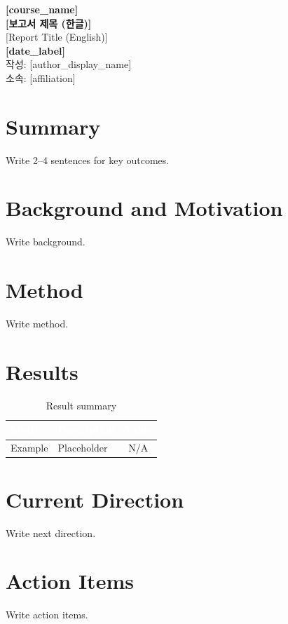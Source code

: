 \documentclass[11pt,a4paper]{article}
\newenvironment{keybox}[1]{%
  \begin{tcolorbox}[colback=bgLight, colframe=themeBlue!60,
    title={\small\bfseries\color{white}#1},
    coltitle=white, colbacktitle=themeBlue,
    left=6pt, right=6pt, top=4pt, bottom=4pt,
    boxrule=0.6pt]
}{\end{tcolorbox}}
\begin{document}
\begin{titlepage}
\pagecolor{themeNavy}
\color{white}
\vspace*{1.8cm}
\begin{center}
{\small\color{themeLight}\textbf{[course\_name]}}\\[1.2cm]
{\Large\bfseries [보고서 제목 (한글)]}\\[0.4cm]
{\normalsize\color{themeLight}[Report Title (English)]}\\[1.0cm]
{\Large\bfseries\color{themeLight}[date\_label]}\\[0.6cm]
{\normalsize\color{themeLight}작성: [author\_display\_name]\\소속: [affiliation]}
\vfill
\end{center}
\end{titlepage}
\pagecolor{white}\color{black}

\tableofcontents
\newpage

\section{Summary}
\begin{keybox}{핵심 요약}
Write 2--4 sentences for key outcomes.
\end{keybox}

\section{Background and Motivation}
Write background.

\section{Method}
Write method.

\section{Results}
\begin{table}[H]
\centering\small
\begin{tabularx}{\linewidth}{|l|X|c|}
\hline
\rowcolor{tableHead}\textcolor{white}{\textbf{Metric}} & \textcolor{white}{\textbf{Description}} & \textcolor{white}{\textbf{Value}} \\
\hline
Example & Placeholder & N/A \\
\hline
\end{tabularx}
\caption{Result summary}
\end{table}

\clearpage
\section{Current Direction}
Write next direction.

\section{Action Items}
Write action items.
\end{document}
